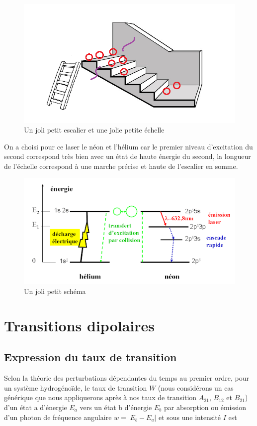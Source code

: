 \begin{figure}[tph]
    \centering
    \includegraphics[scale=1.0]{Images2/Escalier 1.png}
    \caption{Un joli petit escalier et une jolie petite échelle}
    \label{fig:Analogie}
\end{figure}
On a choisi pour ce laser le néon et l'hélium car le premier niveau d'excitation du second correspond très bien avec un état de haute énergie du second, la longueur de l'échelle correspond à une marche précise et haute de l'escalier en somme.\\
\begin{figure}[tph]
    \centering
    \includegraphics[scale=0.8]{Images2/hélium-néon.png}
    \caption{Un joli petit schéma}
    \label{fig:schéma hélium-néon}
\end{figure}



\newpage
\section{Transitions dipolaires}
\subsection{Expression du taux de transition}
Selon la théorie des perturbations dépendantes du temps au premier ordre, pour un système hydrogénoïde, le taux de transition $W$ (nous considérons un cas générique que nous appliquerons après à nos taux de transition $A_{21}$, $B_{12}$ et $B_{21}$) d'un état a d'énergie $E_a$ vers un état b d'énergie $E_b$ par absorption ou émission d'un photon de fréquence angulaire $w=|E_b-E_a|$ et sous une intensité $I$ est

